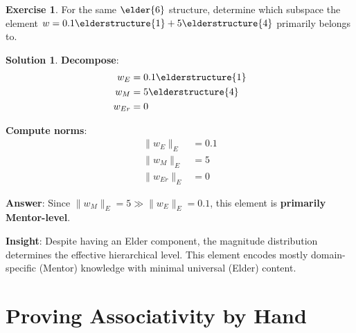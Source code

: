 \documentclass[12pt,a4paper]{article}
\theoremstyle{definition}
\newtheorem{exercise}{Exercise}[section]
\newtheorem{solution}{Solution}[section]
\theoremstyle{remark}
\begin{document}
\begin{exercise}
For the same $\elder{6}$ structure, determine which subspace the element $w = 0.1\elderstructure{1} + 5\elderstructure{4}$ primarily belongs to.
\end{exercise}

\begin{solution}
\textbf{Decompose}:
\begin{align}
w_E &= 0.1\elderstructure{1} \\
w_M &= 5\elderstructure{4} \\
w_{Er} &= 0
\end{align}

\textbf{Compute norms}:
\begin{align}
\|w_E\|_E &= 0.1 \\
\|w_M\|_E &= 5 \\
\|w_{Er}\|_E &= 0
\end{align}

\textbf{Answer}: Since $\|w_M\|_E = 5 \gg \|w_E\|_E = 0.1$, this element is \textbf{primarily Mentor-level}.

\textbf{Insight}: Despite having an Elder component, the magnitude distribution determines the effective hierarchical level. This element encodes mostly domain-specific (Mentor) knowledge with minimal universal (Elder) content.
\end{solution}

\newpage
\section{Proving Associativity by Hand}
\end{document}
